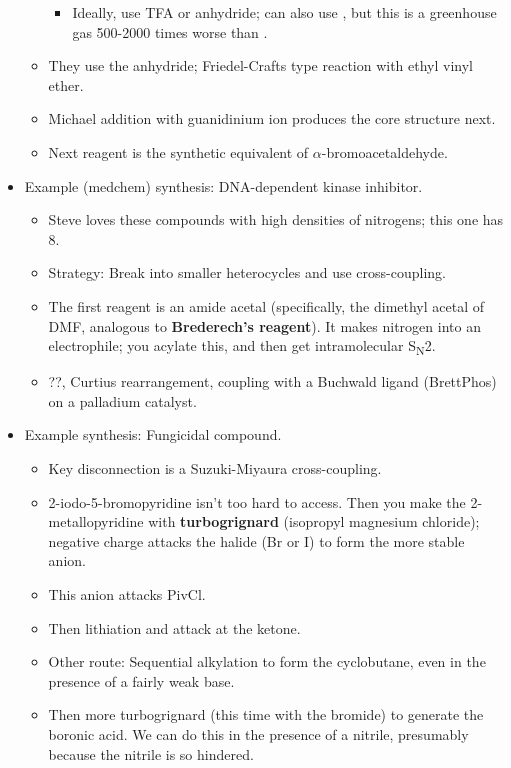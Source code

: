 \documentclass[../notes.tex]{subfiles}
\begin{document}
\begin{itemize}
\begin{itemize}
\begin{itemize}
            \item Ideally, use TFA or anhydride; can also use , but this is a greenhouse gas 500-2000 times worse than .
        \end{itemize}
        \item They use the anhydride; Friedel-Crafts type reaction with ethyl vinyl ether.
        \item Michael addition with guanidinium ion produces the core structure next.
        \item Next reagent is the synthetic equivalent of $\alpha$-bromoacetaldehyde.
    \end{itemize}
    \item Example (medchem) synthesis: DNA-dependent kinase inhibitor.
    \begin{itemize}
        \item Steve loves these compounds with high densities of nitrogens; this one has 8.
        \item Strategy: Break into smaller heterocycles and use  cross-coupling.
        \item The first reagent is an amide acetal (specifically, the dimethyl acetal of DMF, analogous to \textbf{Brederech's reagent}). It makes nitrogen into an electrophile; you acylate this, and then get intramolecular S\textsubscript{N}2.
        \item ??, Curtius rearrangement,  coupling with a Buchwald ligand (BrettPhos) on a palladium catalyst.
    \end{itemize}
    \item Example synthesis: Fungicidal compound.
    \begin{itemize}
        \item Key disconnection is a Suzuki-Miyaura cross-coupling.
        \item 2-iodo-5-bromopyridine isn't too hard to access. Then you make the 2-metallopyridine with \textbf{turbogrignard} (isopropyl magnesium chloride); negative charge attacks the halide (Br or I) to form the more stable anion.
        \item This anion attacks PivCl.
        \item Then lithiation and attack at the ketone.
        \item Other route: Sequential alkylation to form the cyclobutane, even in the presence of a fairly weak base.
        \item Then more turbogrignard (this time with the bromide) to generate the boronic acid. We can do this in the presence of a nitrile, presumably because the nitrile is so hindered.

\end{itemize}
\end{itemize}
\end{document}
